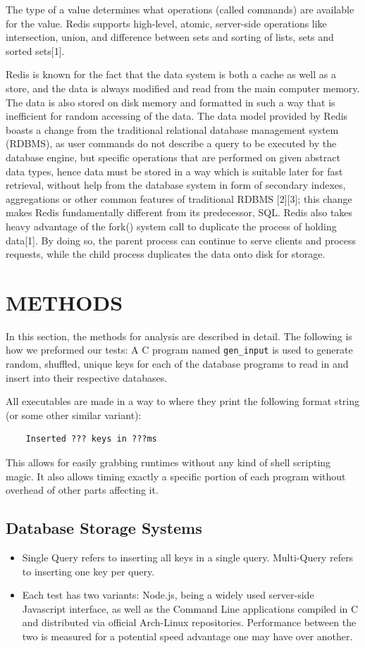 \documentclass[letterpaper, 10 pt, conference]{ieeeconf}
\begin{document}
The type of a value determines what operations (called commands) are available for the value. Redis supports high-level, atomic, server-side operations like intersection, union, and difference between sets and sorting of lists, sets and sorted sets[1].

Redis is known for the fact that the data system is both a cache as well as a store, and the data is always modified and read from the main computer memory. The data is also stored on disk memory and formatted in such a way that is inefficient for random accessing of the data. The data model provided by Redis boasts a change from the traditional relational database management system (RDBMS), as user commands do not describe a query to be executed by the database engine, but specific operations that are performed on given abstract data types, hence data must be stored in a way which is suitable later for fast retrieval, without help from the database system in form of secondary indexes, aggregations or other common features of traditional RDBMS [2][3]; this change makes Redis fundamentally different from its predecessor, SQL. Redis also takes heavy advantage of the fork() system call to duplicate the process of holding data[1]. By doing so, the parent process can continue to serve clients and process requests, while the child process duplicates the data onto disk for storage. 


\section{METHODS}

In this section, the methods for analysis are described in detail. The following is how we preformed our tests: A C program named \texttt{gen\_input} is used to generate random, shuffled, unique keys for each of the database programs to read in and insert into their respective databases.

All executables are made in a way to where they print the following format string (or some other similar variant):
\begin{verbatim}
    Inserted ??? keys in ???ms
\end{verbatim}
This allows for easily grabbing runtimes without any kind of shell scripting magic. It also allows timing exactly a specific portion of each program without overhead of other parts affecting it.
\subsection{Database Storage Systems}
 \begin{itemize}
\item Single Query refers to inserting all keys in a single query. Multi-Query refers to inserting one key per query.
\item Each test has two variants: Node.js, being a widely used server-side Javascript interface, as well as the Command Line applications compiled in C and distributed via official Arch-Linux repositories. Performance between the two is measured for a potential speed advantage one may have over another.
\end{itemize}
\end{document}

